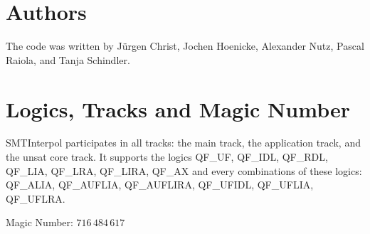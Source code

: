 \documentclass[a4]{article}
\newcommand\SI{SMTInterpol\xspace}
\begin{document}
\section*{Authors}
The code was written by J{\"u}rgen Christ, Jochen Hoenicke, Alexander Nutz, 
Pascal Raiola, and Tanja Schindler.

\section*{Logics, Tracks and Magic Number}

\SI participates in all tracks: the main track, the application track,
and the unsat core track.  It supports the logics QF\_UF, QF\_IDL,
QF\_RDL, QF\_LIA, QF\_LRA, QF\_LIRA, QF\_AX and every combinations of
these logics: QF\_ALIA, QF\_AUFLIA, QF\_AUFLIRA, QF\_UFIDL, QF\_UFLIA,
QF\_UFLRA.

Magic Number: $716\,484\,617$



\end{document}
